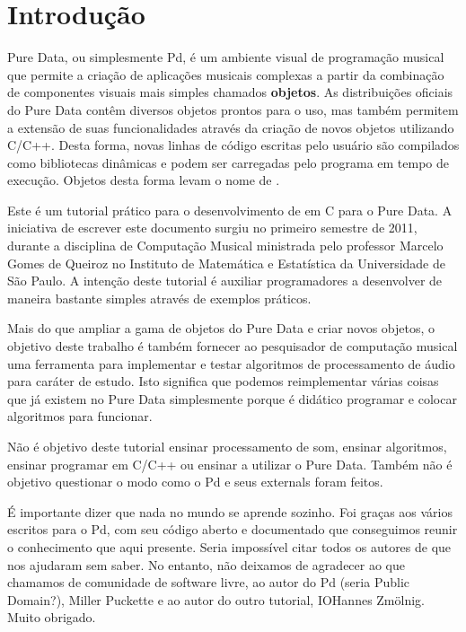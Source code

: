  
\chapter{Introdução}

Pure Data, ou simplesmente Pd, é um ambiente visual de programação musical que
permite a criação de aplicações musicais complexas a partir da combinação de
componentes visuais mais simples chamados \textbf{objetos}.
As distribuições oficiais do Pure Data contêm diversos objetos prontos para o
uso, mas também permitem a extensão de suas funcionalidades através da criação
de novos objetos utilizando C/C++.
Desta forma, novas linhas de código escritas pelo usuário são compilados como
bibliotecas dinâmicas e podem ser carregadas pelo programa em tempo de
execução.
Objetos desta forma levam o nome de \textbf{\externals}.

Este é um tutorial prático para o desenvolvimento de \externals em C para o
Pure Data.
A iniciativa de escrever este documento surgiu no primeiro semestre
de 2011, durante a disciplina de Computação Musical ministrada pelo professor
Marcelo Gomes de Queiroz no Instituto de Matemática e Estatística da
Universidade de São Paulo.
A intenção deste tutorial é auxiliar programadores a desenvolver \externals de
maneira bastante simples através de exemplos práticos.

Mais do que ampliar a gama de objetos do Pure Data e criar novos objetos, o
objetivo deste trabalho é também fornecer ao pesquisador de computação musical
uma ferramenta para implementar e testar algoritmos de processamento de áudio
para caráter de estudo.
Isto significa que podemos reimplementar várias coisas que já existem no Pure
Data simplesmente porque é didático programar e colocar algoritmos para
funcionar.

Não é objetivo deste tutorial ensinar processamento de som, ensinar algoritmos, 
ensinar programar em C/C++ ou ensinar a utilizar o Pure Data.
Também não é objetivo questionar o modo como o Pd e seus externals foram feitos.


É importante dizer que nada no mundo se aprende sozinho.
Foi graças aos vários \externals escritos para o Pd, com seu código aberto e
documentado que conseguimos reunir o conhecimento que aqui presente.
Seria impossível citar todos os autores  de \externals que nos ajudaram sem
saber.
No entanto, não deixamos de agradecer ao que chamamos de comunidade de software
livre, ao autor do Pd (seria Public Domain?),  Miller Puckette e ao autor do
outro tutorial, IOHannes Zmölnig.
Muito obrigado.

